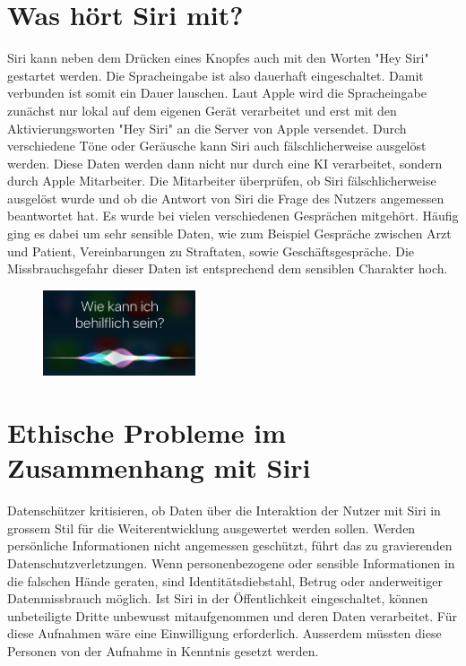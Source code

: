 \documentclass{article}
\begin{document}
\section{Was hört Siri mit?}
Siri kann neben dem Drücken eines Knopfes auch mit den Worten "Hey Siri" gestartet werden. Die Spracheingabe ist also dauerhaft eingeschaltet. Damit verbunden ist somit ein Dauer lauschen. Laut Apple wird die Spracheingabe zunächst nur lokal auf dem eigenen Gerät verarbeitet und erst mit den Aktivierungsworten "Hey Siri" an die Server von Apple versendet. Durch verschiedene Töne oder Geräusche kann Siri auch fälschlicherweise ausgelöst werden. Diese Daten werden dann nicht nur durch eine KI verarbeitet, sondern durch Apple Mitarbeiter. Die Mitarbeiter überprüfen, ob Siri fälschlicherweise ausgelöst wurde und ob die Antwort von Siri die Frage des Nutzers angemessen beantwortet hat.
Es wurde bei vielen verschiedenen Gesprächen mitgehört. Häufig ging es dabei um sehr sensible Daten, wie zum Beispiel Gespräche zwischen Arzt und Patient, Vereinbarungen zu Straftaten, sowie Geschäftsgespräche. Die Missbrauchsgefahr dieser Daten ist entsprechend dem sensiblen Charakter hoch. 



\begin{figure}[ht]
    \centering
    \includegraphics[width=0.4\textwidth]{Spracherkennung.jpg}
    \label{fig:Spracherkennung}
    \end{figure}


\section{Ethische Probleme im Zusammenhang mit Siri}
Datenschützer kritisieren, ob Daten über die Interaktion der Nutzer mit Siri in grossem Stil für die Weiterentwicklung ausgewertet werden sollen. Werden persönliche Informationen nicht angemessen geschützt, führt das zu gravierenden Datenschutzverletzungen. Wenn personenbezogene oder sensible Informationen in die falschen Hände geraten, sind Identitätsdiebstahl, Betrug oder anderweitiger Datenmissbrauch möglich. Ist Siri in der Öffentlichkeit eingeschaltet, können unbeteiligte Dritte unbewusst mitaufgenommen und deren Daten verarbeitet.
Für diese Aufnahmen wäre eine Einwilligung erforderlich. Ausserdem müssten diese Personen von der Aufnahme in Kenntnis gesetzt werden.
\end{document}
